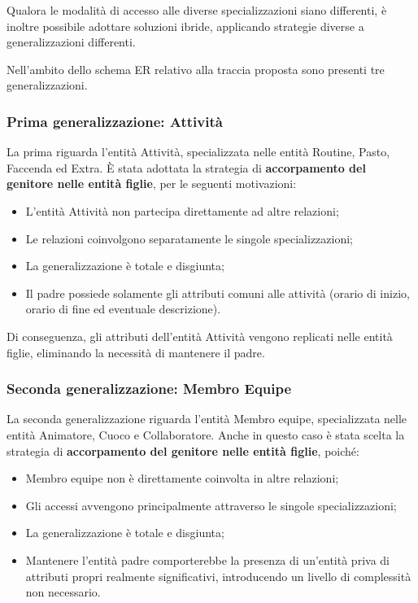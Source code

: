 \documentclass[11pt,a4paper]{article}
\begin{document}
Qualora le modalità di accesso alle diverse specializzazioni siano differenti, è inoltre
possibile adottare soluzioni ibride, applicando strategie diverse a generalizzazioni differenti.

Nell'ambito dello schema ER relativo alla traccia proposta sono presenti tre generalizzazioni.

\subsubsection{Prima generalizzazione: Attività}

La prima riguarda l'entità Attività, specializzata nelle entità Routine, Pasto, Faccenda ed
Extra. È stata adottata la strategia di \textbf{accorpamento del genitore nelle entità figlie},
per le seguenti motivazioni:

\begin{itemize}[nosep]
  \item L'entità Attività non partecipa direttamente ad altre relazioni;
  \item Le relazioni coinvolgono separatamente le singole specializzazioni;
  \item La generalizzazione è totale e disgiunta;
  \item Il padre possiede solamente gli attributi comuni alle attività (orario di inizio,
    orario di fine ed eventuale descrizione).
\end{itemize}

Di conseguenza, gli attributi dell'entità Attività vengono replicati nelle entità figlie,
eliminando la necessità di mantenere il padre.

\subsubsection{Seconda generalizzazione: Membro Equipe}

La seconda generalizzazione riguarda l'entità Membro equipe, specializzata nelle entità
Animatore, Cuoco e Collaboratore. Anche in questo caso è stata scelta la strategia di
\textbf{accorpamento del genitore nelle entità figlie}, poiché:

\begin{itemize}[nosep]
  \item Membro equipe non è direttamente coinvolta in altre relazioni;
  \item Gli accessi avvengono principalmente attraverso le singole specializzazioni;
  \item La generalizzazione è totale e disgiunta;
  \item Mantenere l'entità padre comporterebbe la presenza di un'entità priva di attributi
    propri realmente significativi, introducendo un livello di complessità non necessario.
\end{itemize}
\end{document}
